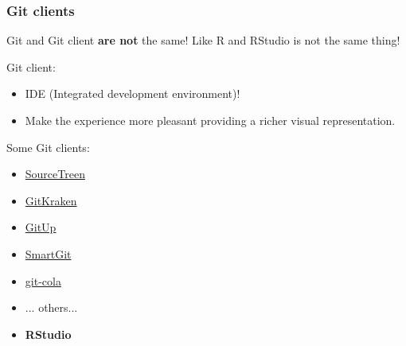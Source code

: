 \documentclass{beamer}
\begin{document}
\begin{frame}
\frametitle{Git clients}

Git and Git client \textbf{are not} the same! Like R and RStudio is not the same thing!
\hfill \break

Git client:
\begin{itemize}
    \item IDE (Integrated development environment)!
    \item Make the experience more pleasant providing a richer visual representation.
\end{itemize}

\hfill 

Some Git clients:
\begin{itemize}
    \item \href{https://www.sourcetreeapp.com/}{\faStar SourceTreen} 
    \item \href{https://www.gitkraken.com/}{\faStar GitKraken}
    \item \href{https://gitup.co/}{\faStar GitUp} 
    \item \href{https://www.syntevo.com/smartgit/}{\faStar SmartGit} 
    \item \href{https://git-cola.github.io/}{\faStar git-cola} 
    \item ... others... 
    \item \textbf{RStudio} 
\end{itemize}
\end{frame}
\end{document}
